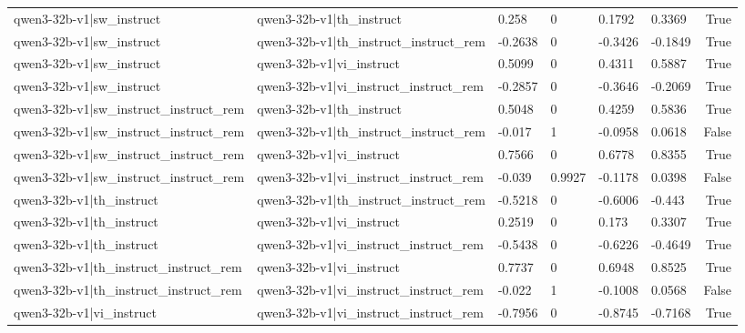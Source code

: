 \begin{table}
\begin{tabular}{llllllr}
qwen3-32b-v1|sw_instruct & qwen3-32b-v1|th_instruct & 0.258 & 0 & 0.1792 & 0.3369 & True \\
qwen3-32b-v1|sw_instruct & qwen3-32b-v1|th_instruct_instruct_rem & -0.2638 & 0 & -0.3426 & -0.1849 & True \\
qwen3-32b-v1|sw_instruct & qwen3-32b-v1|vi_instruct & 0.5099 & 0 & 0.4311 & 0.5887 & True \\
qwen3-32b-v1|sw_instruct & qwen3-32b-v1|vi_instruct_instruct_rem & -0.2857 & 0 & -0.3646 & -0.2069 & True \\
qwen3-32b-v1|sw_instruct_instruct_rem & qwen3-32b-v1|th_instruct & 0.5048 & 0 & 0.4259 & 0.5836 & True \\
qwen3-32b-v1|sw_instruct_instruct_rem & qwen3-32b-v1|th_instruct_instruct_rem & -0.017 & 1 & -0.0958 & 0.0618 & False \\
qwen3-32b-v1|sw_instruct_instruct_rem & qwen3-32b-v1|vi_instruct & 0.7566 & 0 & 0.6778 & 0.8355 & True \\
qwen3-32b-v1|sw_instruct_instruct_rem & qwen3-32b-v1|vi_instruct_instruct_rem & -0.039 & 0.9927 & -0.1178 & 0.0398 & False \\
qwen3-32b-v1|th_instruct & qwen3-32b-v1|th_instruct_instruct_rem & -0.5218 & 0 & -0.6006 & -0.443 & True \\
qwen3-32b-v1|th_instruct & qwen3-32b-v1|vi_instruct & 0.2519 & 0 & 0.173 & 0.3307 & True \\
qwen3-32b-v1|th_instruct & qwen3-32b-v1|vi_instruct_instruct_rem & -0.5438 & 0 & -0.6226 & -0.4649 & True \\
qwen3-32b-v1|th_instruct_instruct_rem & qwen3-32b-v1|vi_instruct & 0.7737 & 0 & 0.6948 & 0.8525 & True \\
qwen3-32b-v1|th_instruct_instruct_rem & qwen3-32b-v1|vi_instruct_instruct_rem & -0.022 & 1 & -0.1008 & 0.0568 & False \\
qwen3-32b-v1|vi_instruct & qwen3-32b-v1|vi_instruct_instruct_rem & -0.7956 & 0 & -0.8745 & -0.7168 & True \\
\bottomrule
\end{tabular}
\end{table}
